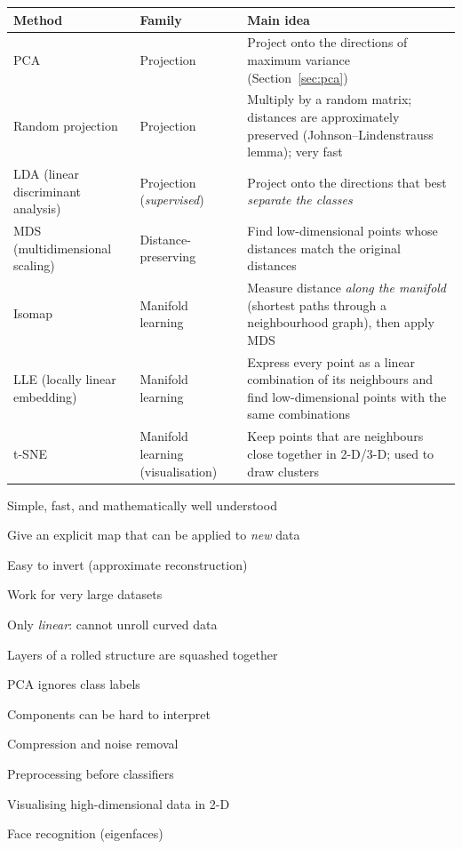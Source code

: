 \begin{center}
\begin{tabular}{@{}p{2.9cm}p{2.4cm}p{8.4cm}@{}}
\toprule
\textbf{Method} & \textbf{Family} & \textbf{Main idea}\\
\midrule
PCA & Projection & Project onto the directions of maximum variance (Section~\ref{sec:pca})\\
Random projection & Projection & Multiply by a random matrix; distances are approximately preserved (Johnson--Lindenstrauss lemma); very fast\\
LDA (linear discriminant analysis) & Projection (\emph{supervised}) & Project onto the directions that best \emph{separate the classes}\\
MDS (multidimensional scaling) & Distance-preserving & Find low-dimensional points whose distances match the original distances\\
Isomap & Manifold learning & Measure distance \emph{along the manifold} (shortest paths through a neighbourhood graph), then apply MDS\\
LLE (locally linear embedding) & Manifold learning & Express every point as a linear combination of its neighbours and find low-dimensional points with the same combinations\\
t-SNE & Manifold learning (visualisation) & Keep points that are neighbours close together in 2-D/3-D; used to draw clusters\\
\bottomrule
\end{tabular}
\end{center}

{\item Simple, fast, and mathematically well understood
 \item Give an explicit map that can be applied to \emph{new} data
 \item Easy to invert (approximate reconstruction)
 \item Work for very large datasets}
{\item Only \emph{linear}: cannot unroll curved data
 \item Layers of a rolled structure are squashed together
 \item PCA ignores class labels
 \item Components can be hard to interpret}
{\item Compression and noise removal
 \item Preprocessing before classifiers
 \item Visualising high-dimensional data in 2-D
 \item Face recognition (eigenfaces)}

